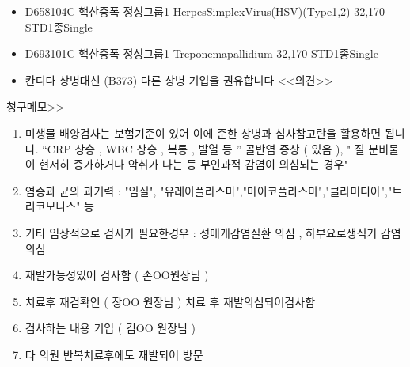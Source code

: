 {\begin{itemize}
\item[\dschemical] D658104C	핵산증폭-정성그룹1 HerpesSimplexVirus(HSV)(Type1,2)	32,170 STD1종Single
\item[\dschemical] D693101C	핵산증폭-정성그룹1 Treponemapallidium	32,170 STD1종Single
\item[\dsjuridical] 칸디다 상병대신 (B373) 다른 상병 기입을 권유합니다 <<의견>>
\end{itemize}
청구메모>>
\begin{enumerate}\tightlist
\item 미생물 배양검사는 보험기준이 있어 이에 준한 상병과  심사참고란을  활용하면 됩니다. “CRP 상승 , WBC  상승 ,  복통 ,  발열 등 ” 골반염  증상 ( 있음 ), " 질 분비물이 현저히 증가하거나 악취가 나는 등 부인과적 감염이 의심되는 경우"
\item 염증과 균의  과거력 : "임질", "유레아플라스마","마이코플라스마","클라미디아","트리코모나스" 등
\item 기타 임상적으로 검사가  필요한경우 :  성매개감염질환  의심 ,  하부요로생식기 감염의심
\item 재발가능성있어   검사함 ( 손OO원장님 )
\item 치료후  재검확인 ( 장OO   원장님 )  치료 후 재발의심되어검사함
\item 검사하는   내용 기입 ( 김OO 원장님 )
\item 타 의원 반복치료후에도 재발되어 방문
\end{enumerate}
}
